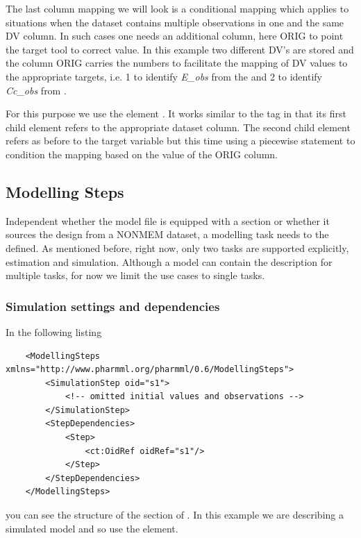The last column mapping we will look is a conditional mapping which 
applies to situations when the dataset contains multiple observations 
in one and the same DV column. In such cases one needs an additional column, 
here ORIG to point the target tool to correct value. In this example two different 
DV's are stored and the column ORIG carries the numbers to facilitate the mapping
of DV values to the appropriate targets, i.e. 1 to identify \emph{E\_obs} from the 
  and 2 to identify \emph{Cc\_obs} from .

For this purpose we use the element . It works similar to 
the  tag in that its first child element refers to the appropriate 
dataset column. The second child element refers as before to the target variable 
but this time using a piecewise statement to condition the mapping based on the 
value of the ORIG column.

\subsection{Modelling Steps}
\label{sec:eg1-NONMEM}
Independent whether the model file is equipped with a  section
or whether it sources the design from a NONMEM dataset, a modelling 
task needs to the defined. As mentioned before, right now, only two tasks are 
supported explicitly, estimation and simulation. Although a model can contain 
the description for multiple tasks, for now we limit the use cases to single tasks.

\subsubsection{Simulation settings and dependencies}

In the following listing 
\lstset{language=XML}
\begin{lstlisting}
    <ModellingSteps xmlns="http://www.pharmml.org/pharmml/0.6/ModellingSteps">
        <SimulationStep oid="s1">
            <!-- omitted initial values and observations -->
        </SimulationStep>
        <StepDependencies>
            <Step>
                <ct:OidRef oidRef="s1"/>
            </Step>
        </StepDependencies>
    </ModellingSteps>
\end{lstlisting}
you can see the structure of the
 section of \pharmml.  In this example we are
describing a simulated model and so use the 
element.

